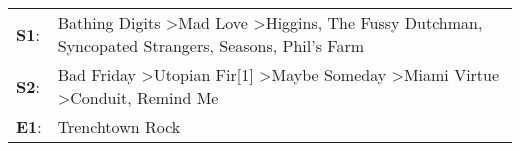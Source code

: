 \begin{supertabular}{p{0.03\textwidth}p{0.92\textwidth}}
 \textbf{S1}:  &  Bathing Digits\textsuperscript{} \textgreater \enspace Mad Love\textsuperscript{} \textgreater \enspace Higgins\textsuperscript{}, \enspace The Fussy Dutchman\textsuperscript{}, \enspace Syncopated Strangers\textsuperscript{}, \enspace Seasons\textsuperscript{}, \enspace Phil's Farm\textsuperscript{}  \enspace  \\
 \textbf{S2}:  &                           Bad Friday\textsuperscript{} \textgreater \enspace Utopian Fir[1]\textsuperscript{} \textgreater \enspace Maybe Someday\textsuperscript{} \textgreater \enspace Miami Virtue\textsuperscript{} \textgreater \enspace Conduit\textsuperscript{}, \enspace Remind Me\textsuperscript{}  \enspace  \\
 \textbf{E1}:  &                                                                                                                                                                                                                                                                              Trenchtown Rock\textsuperscript{}  \enspace  \\
\end{supertabular}
